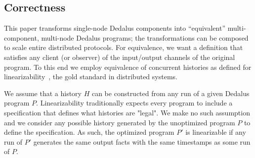 \subsection{Correctness}
\label{sec:general-correctness}
This paper transforms single-node Dedalus components into ``equivalent'' multi-component, multi-node Dedalus programs; the transformations can be composed to scale entire distributed protocols.
For equivalence, we want a definition that satisfies any client (or observer) of the input/output channels of the original program.
To this end we employ equivalence of concurrent histories as defined for linearizability~\cite{linearizability}, the gold standard in distributed systems.


We assume that a history $H$ can be constructed from any run of a given Dedalus program $P$. Linearizability traditionally expects every program to include a specification that defines what histories are "legal". We make no such assumption and we consider any possible history generated by the unoptimized program $P$ to define the specification.  As such, the optimized program $P'$ is linearizable if any run of $P'$ generates the same output facts with the same timestamps as some run of $P$.


